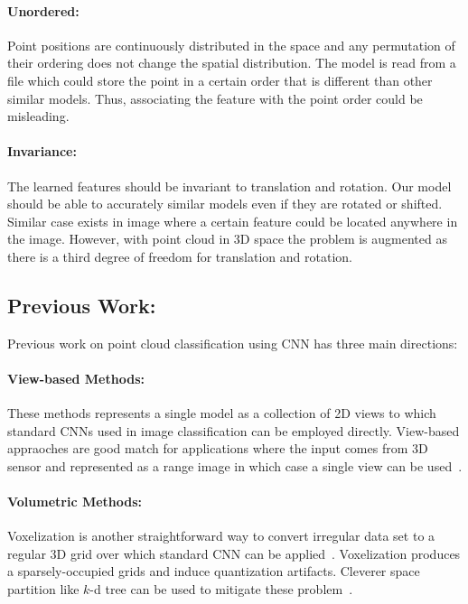 \paragraph{Unordered:} Point positions are continuously distributed in the space and any permutation of their ordering does not change the spatial distribution. The model is read from a file which could store the point in a certain order that is different than other similar models. Thus, associating the feature with the point order could be misleading.
\paragraph{Invariance:} The learned features should be invariant to translation and rotation. Our model should be able to accurately similar models even if they are rotated or shifted. Similar case exists in image where a certain feature could be located anywhere in the image. However, with point cloud in 3D space the problem is augmented as there is a third degree of freedom for translation and rotation. 



\subsection{Previous Work:}
Previous work on point cloud classification using CNN has three main directions:
\paragraph{View-based Methods:}
These methods represents a single model as a collection of 2D views to which standard CNNs used in image classification can be employed directly. View-based appraoches are good match for applications where the input comes from 3D sensor and represented as a range image in which case a single view can be used~\citep{wei2016dense}. 

\paragraph{Volumetric Methods:}
Voxelization is another straightforward way to convert irregular data set to a regular 3D grid over which standard CNN can be applied~\citep{maturana2015voxnet}. Voxelization produces a sparsely-occupied grids and induce quantization artifacts. Cleverer space partition like $k$-d tree can be used to mitigate these problem~\citep{klokov2017escape}.
